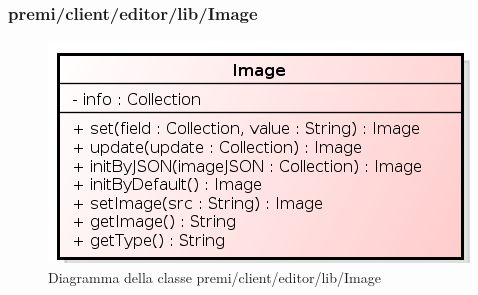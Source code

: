 \subsubsection{premi/client/editor/lib/Image}
\begin{figure}[H]
\begin{center}
\includegraphics[scale=0.80]{img/diacla/Image.png}
\caption{Diagramma della classe premi/client/editor/lib/Image}
\end{center}
\end{figure}

